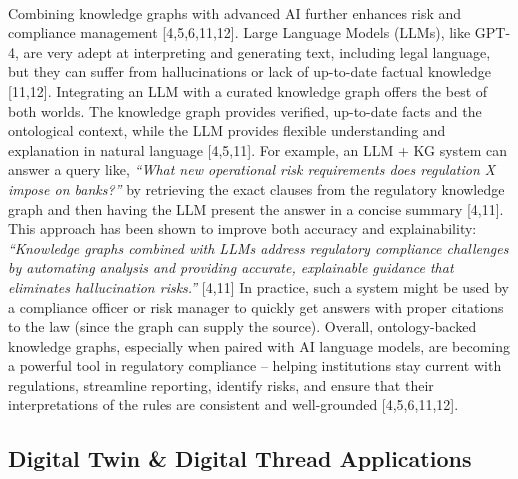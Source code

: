         \paragraph{} Combining knowledge graphs with advanced AI further enhances risk and compliance management [4,5,6,11,12]. Large Language Models (LLMs), like GPT-4, are very adept at interpreting and generating text, including legal language, but they can suffer from hallucinations or lack of up-to-date factual knowledge [11,12]. Integrating an LLM with a curated knowledge graph offers the best of both worlds. The knowledge graph provides verified, up-to-date facts and the ontological context, while the LLM provides flexible understanding and explanation in natural language [4,5,11]. For example, an LLM + KG system can answer a query like, \textit{“What new operational risk requirements does regulation X impose on banks?”} by retrieving the exact clauses from the regulatory knowledge graph and then having the LLM present the answer in a concise summary [4,11]. This approach has been shown to improve both accuracy and explainability:\textit{ “Knowledge graphs combined with LLMs address regulatory compliance challenges by automating analysis and providing accurate, explainable guidance that eliminates hallucination risks.”} [4,11] In practice, such a system might be used by a compliance officer or risk manager to quickly get answers with proper citations to the law (since the graph can supply the source). Overall, ontology-backed knowledge graphs, especially when paired with AI language models, are becoming a powerful tool in regulatory compliance – helping institutions stay current with regulations, streamline reporting, identify risks, and ensure that their interpretations of the rules are consistent and well-grounded [4,5,6,11,12].

    \subsection{Digital Twin \& Digital Thread Applications}

